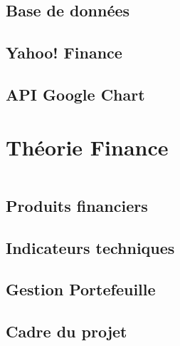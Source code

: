 \documentclass{beamer}
\begin{document}
	     \subsection{Base de données} %
	            
	    \subsection{Yahoo! Finance} %
	        
	    \subsection{API Google Chart} %
	               
        	
     \section{Théorie Finance}
       \begin{frame}
            \begin{columns}[t]
  				\begin{column}{5cm}
  					\tableofcontents[sections={1-4}, currentsection, hideothersubsections]
  				\end{column}
  				\begin{column}{5cm}
  				\tableofcontents[sections={5-9}, currentsection, hideothersubsections]
  				\end{column}
  			\end{columns}
        \end{frame}
        \subsection{Produits financiers} %
	        
	    \subsection{Indicateurs techniques} %
	            
		\subsection{Gestion Portefeuille} %
	         
	    \subsection{Cadre du projet} %
	            
	        
\end{document}
